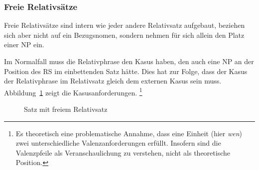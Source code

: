 \subsubsection{Freie Relativsätze}

\label{sec:freierelativsaetze}

Freie Relativsätze sind intern wie jeder andere Relativsatz aufgebaut, beziehen sich aber nicht auf ein Bezugsnomen, sondern nehmen für sich allein den Platz einer NP ein.

\begin{exe}
  \ex\label{ex:saetze1991}
  \begin{xlist}
  \end{xlist}
\end{exe}


Im Normalfall muss die Relativphrase den Kasus haben, den auch eine NP an der Position des RS im einbettenden Satz hätte.
Dies hat zur Folge, dass der Kasus der Relativphrase im Relativsatz gleich dem externen Kasus sein muss.
Abbildung~\ref{fig:saetze1991b} zeigt die Kasusanforderungen.%
\footnote{Es theoretisch eine problematische Annahme, dass eine Einheit (hier \textit{wen}) zwei unterschiedliche Valenzanforderungen erfüllt.
Insofern sind die Valenzpfeile als Veranschaulichung zu verstehen, nicht als theoretische Position.}

\begin{figure}[!h]
  \centering
  \caption{Satz mit freiem Relativsatz}
  \label{fig:saetze1991b}
\end{figure}

